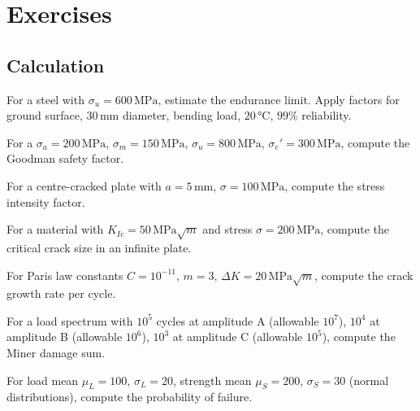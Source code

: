 \section{Exercises}

\subsection*{Calculation}

\begin{exercise}
For a steel with $\sigma_u = 600\,\si{\mega\pascal}$, estimate the endurance limit. Apply factors for ground surface, $30\,\si{\milli\meter}$ diameter, bending load, $20\,\si{\degreeCelsius}$, $99\%$ reliability.
\end{exercise}

\begin{exercise}
For a $\sigma_a = 200\,\si{\mega\pascal}$, $\sigma_m = 150\,\si{\mega\pascal}$, $\sigma_u = 800\,\si{\mega\pascal}$, $\sigma_e' = 300\,\si{\mega\pascal}$, compute the Goodman safety factor.
\end{exercise}

\begin{exercise}
For a centre-cracked plate with $a = 5\,\si{\milli\meter}$, $\sigma = 100\,\si{\mega\pascal}$, compute the stress intensity factor.
\end{exercise}

\begin{exercise}
For a material with $K_{Ic} = 50\,\si{\mega\pascal\sqrt{m}}$ and stress $\sigma = 200\,\si{\mega\pascal}$, compute the critical crack size in an infinite plate.
\end{exercise}

\begin{exercise}
For Paris law constants $C = 10^{-11}$, $m = 3$, $\Delta K = 20\,\si{\mega\pascal\sqrt{m}}$, compute the crack growth rate per cycle.
\end{exercise}

\begin{exercise}
For a load spectrum with $10^5$ cycles at amplitude A (allowable $10^7$), $10^4$ at amplitude B (allowable $10^6$), $10^3$ at amplitude C (allowable $10^5$), compute the Miner damage sum.
\end{exercise}

\begin{exercise}
For load mean $\mu_L = 100$, $\sigma_L = 20$, strength mean $\mu_S = 200$, $\sigma_S = 30$ (normal distributions), compute the probability of failure.
\end{exercise}

